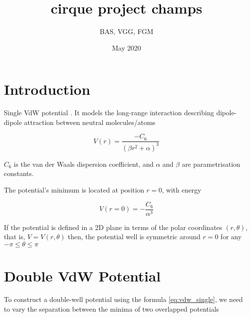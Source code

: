 \documentclass{article}
\title{cirque project champs}
\author{BAS, VGG, FGM}
\date{May 2020}
\begin{document}
\maketitle

\section{Introduction}


Single VdW potential \cite{Soley2018}. It models the long-range interaction describing dipole-dipole attraction between neutral molecules/atoms

\begin{equation}
    V(r) = \frac{- C_6}{(\beta r^2 + \alpha)^3}
    \label{eq:vdw_single}
\end{equation}

$C_6$ is the van der Waals dispersion coefficient, and $\alpha$ and $\beta$ are parametrisation constants.

The potential's minimum is located at position $r = 0$, with energy 

\begin{equation*}
    V\left( r = 0\right) = - \frac{C_6}{\alpha^3}
\end{equation*}

If the potential is defined in a 2D plane in terms of the polar coordinates $(r, \theta)$, that is, $V = V(r, \theta)$ then, the potential well is symmetric around $r = 0$ for any $ -\pi \leq \theta \leq \pi$

\section{Double VdW Potential}

To construct a double-well potential using the formula \eqref{eq:vdw_single}, we need to vary the separation between the minima of two overlapped potentials




\newpage


\end{document}

